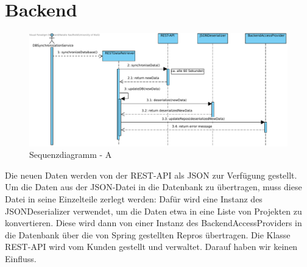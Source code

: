 


\section{Backend}

\begin{figure}[h]
	\centering
	\includegraphics[width=\linewidth]{img/diagrams/RESThandling.pdf}	
	\caption{Sequenzdiagramm - A}
	\label{fig:sequenz-a}
\end{figure}

\noindent
Die neuen Daten werden von der REST-API als JSON zur Verfügung gestellt. Um die Daten aus der JSON-Datei in die Datenbank zu übertragen, muss  diese Datei in seine Einzelteile zerlegt werden: Dafür wird eine Instanz des JSONDeserializer verwendet, um die Daten etwa in eine Liste von Projekten zu konvertieren. Diese wird dann von einer Instanz des BackendAccessProviders in die Datenbank über die von Spring gestellten Repros übertragen.
Die Klasse REST-API wird vom Kunden gestellt und verwaltet. Darauf haben wir keinen Einfluss.

\clearpage

